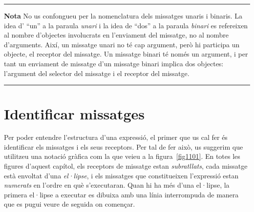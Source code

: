 \newpage

\noindent
\rule{\textwidth}{2pt}
\noindent
\textbf{Nota} No us confongueu per la nomenclatura dels missatges unaris i binaris. La idea d' ``un'' a la paraula \emph{unari} i la idea de ``dos'' a la paraula \emph{binari} es refereixen al nombre d'objectes involucrats en l'enviament del missatge, no al nombre d'arguments. Així, un missatge unari no té cap argument, però hi participa un objecte, el receptor del missatge. Un missatge binari té només un argument, i per tant un enviament de missatge d'un missatge binari implica dos objectes: l'argument del selector del missatge i el receptor del missatge.\\
\noindent
\rule{\textwidth}{2pt}

\section{Identificar missatges}
Per poder entendre l'estructura d'una expressió, el primer que us cal fer és identificar els missatges i els seus receptors. Per tal de fer això, us suggerim que utilitzeu una notació gràfica com la que veieu a la figura~\ref{fig1101}. En totes les figures d'aquest capítol, els receptors de missatge estan \emph{subratllats}, cada missatge està envoltat d'una \emph{el·lipse}, i els missatges que constitueixen l'expressió estan \emph{numerats} en l'ordre en què s'executaran. Quan hi ha més d'una el·lipse, la primera el·lipse a executar es dibuixa amb una línia interrompuda de manera que es pugui veure de seguida on començar.

